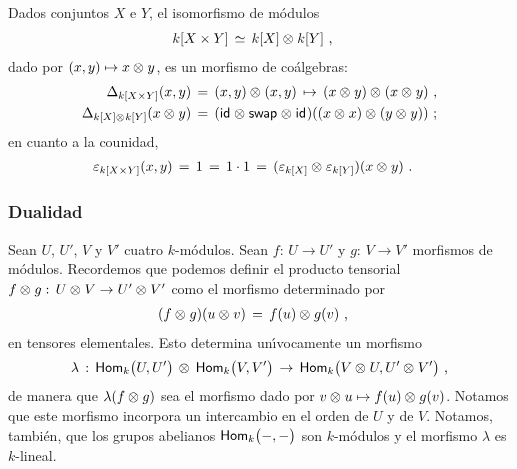 \begin{ejemploCoalgebra}\label{ejemplo:coalgebradeconjuntoproducto}
	Dados conjuntos $X$ e $Y$, el isomorfismo de m\'{o}dulos
	\begin{align*}
		k[X\times Y] & \,\simeq\,k[X]\tensor k[Y]
		\text{ ,}
	\end{align*}
	dado por $(x,y)\mapsto x\tensor y$, es un morfismo de co\'{a}lgebras:
	\begin{align*}
		\coproducto[{k[X\times Y]}](x,y) & \,=\,(x,y)\tensor (x,y)
			\,\mapsto\,(x\tensor y)\tensor (x\tensor y)
			\text{ ,} \\
		\coproducto[{k[X]\tensor k[Y]}](x\tensor y) & \,=\,
			(\id\tensor\swap\tensor\id)
				((x\tensor x)\tensor (y\tensor y))
		\text{ ;}
	\end{align*}
	en cuanto a la counidad,
	\begin{align*}
		\counidad[{k[X\times Y]}](x,y) & \,=\, 1 \,=\,1\cdot 1\,=\,
			(\counidad[{k[X]}]\tensor\counidad[{k[Y]}])(x\tensor y)
		\text{ .}
	\end{align*}
\end{ejemploCoalgebra}

\subsubsection{Dualidad}\label{subsubsec:coalgebras:dualidad}

Sean $U$, $U'$, $V$ y $V'$ cuatro $k$-m\'{o}dulos. Sean $f:\,U\rightarrow U'$ y
$g:\,V\rightarrow V'$ morfismos de m\'{o}dulos. Recordemos que podemos definir
el producto tensorial $f\tensor g:\,U\tensor V\rightarrow U'\tensor V'$ como el
morfismo determinado por
\begin{align*}
	(f\tensor g)(u\tensor v) & \,=\,f(u)\tensor g(v)
	\text{ ,}
\end{align*}
%
en tensores elementales. Esto determina un\'{\i}vocamente un morfismo
\begin{equation}
	\label{eq:productotensorialdemorfismosdemodulos}
	\lambda \,:\,\Hom[k]\big(U,U'\big)\,\tensor\,\Hom[k]\big(V,V'\big)
		\,\rightarrow\,\Hom[k]\big(V\tensor U,U'\tensor V'\big)
	\text{ ,}
\end{equation}
%
de manera que $\lambda(f\tensor g)$ sea el morfismo dado por
$v\tensor u\mapsto f(u)\tensor g(v)$. Notamos que este morfismo incorpora un
intercambio en el orden de $U$ y de $V$. Notamos, tambi\'{e}n, que los grupos
abelianos $\Hom[k]\big(-,-\big)$ son $k$-m\'{o}dulos y el morfismo $\lambda$ es
$k$-lineal.

